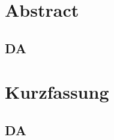 \chapter*{Abstract}
\section*{DA}


\clearpage{\pagestyle{empty}\cleardoublepage}
\chapter*{Kurzfassung}
\section*{DA}

